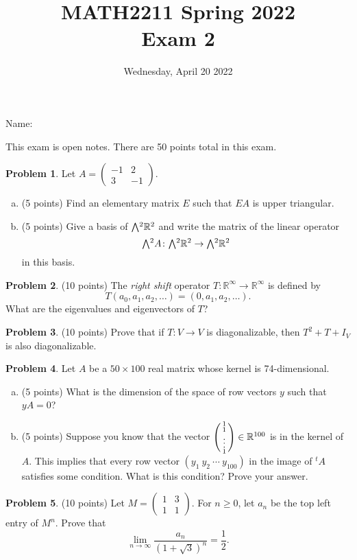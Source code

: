 \documentclass[11pt,oneside]{amsart}
\title{MATH2211 Spring 2022\\
Exam 2}
\author{Wednesday, April 20 2022}
\theoremstyle{definition}
\newtheorem{problem}{Problem}
\newcommand{\bR}{\mathbb{R}}
\newcommand*\colvec[1]{\begin{psmallmatrix}#1\end{psmallmatrix}}
\newcommand{\extp}{\mathchoice{{\textstyle\bigwedge}}%
    {{\bigwedge}}%
    {{\textstyle\wedge}}%
    {{\scriptstyle\wedge}}}
\begin{document}
    \maketitle

    Name: \underline{\hspace{6cm}}

    This exam is open notes. There are 50 points total in this exam.

    \begin{problem}
        Let $A=\begin{pmatrix}
            -1&2\\
            3&-1
        \end{pmatrix}$.
        \begin{enumerate}[(a)]
            \item (5 points) Find an elementary matrix $E$ such that $EA$ is upper triangular.
            \vfill
            \item (5 points) Give a basis of $\extp^2\bR^2$ and write the matrix of the linear operator
            \[\extp^2 A\colon \extp^2 \bR^2\to \extp^2\bR^2\]
            in this basis.
            \vfill
        \end{enumerate}
    \end{problem}
    \newpage

    \begin{problem}
       (10 points) The \emph{right shift} operator $T\colon \bR^\infty\to\bR^\infty$ is defined by
       \[T(a_0,a_1,a_2,\dots)=(0,a_1,a_2,\dots).\]
       What are the eigenvalues and eigenvectors of $T$?
    \end{problem}
    \newpage

    \begin{problem}
        (10 points) Prove that if $T\colon V\to V$ is diagonalizable, then $T^2+T+I_V$ is also diagonalizable.
    \end{problem}
    \vfill
    \newpage

    \begin{problem}
        Let $A$ be a $50\times 100$ real matrix whose kernel is 74-dimensional.
       \begin{enumerate}[(a)]
           \item (5 points) What is the dimension of the space of row vectors $y$ such that $yA=0$?
           \vfill
           \item (5 points) Suppose you know that the vector $\colvec{1\\1\\\vdots\\1}\in \bR^{100}$ is in the kernel of $A$. This implies that every row vector $(y_1\ y_2\ \cdots\ y_{100})$ in the image of $^tA$ satisfies some condition. What is this condition? Prove your answer.
           \vfill
       \end{enumerate}
    \end{problem}
    \newpage

    \begin{problem}
        (10 points) Let $M=\begin{pmatrix}
            1&3\\1&1
        \end{pmatrix}$.
        For $n\geq 0$, let $a_n$ be the top left entry of $M^n$. Prove that
        \[\lim_{n\to\infty}\frac{a_n}{(1+\sqrt3)^n}=\frac 12.\]
    \end{problem}
    \vfill
\end{document}
